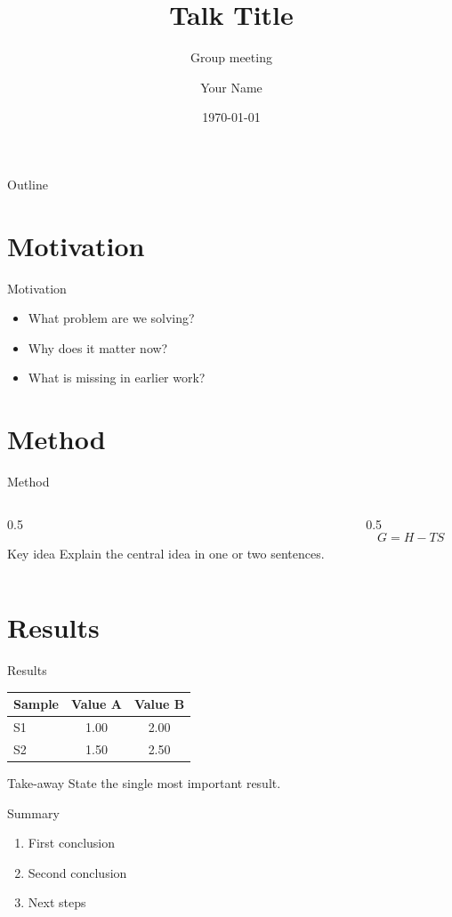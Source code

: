 \documentclass[aspectratio=169]{beamer}
\title{Talk Title}
\subtitle{Group meeting}
\author{Your Name}
\institute{Your Lab, Your University}
\date{\today}
\begin{document}
\begin{frame}
  \titlepage
\end{frame}

\begin{frame}{Outline}
  \tableofcontents
\end{frame}

\section{Motivation}
\begin{frame}{Motivation}
  \begin{itemize}
    \item What problem are we solving?
    \item Why does it matter now?
    \item What is missing in earlier work?
  \end{itemize}
\end{frame}

\section{Method}
\begin{frame}{Method}
  \begin{columns}
    \begin{column}{0.5\textwidth}
      \begin{block}{Key idea}
        Explain the central idea in one or two sentences.
      \end{block}
    \end{column}
    \begin{column}{0.5\textwidth}
      \begin{equation*}
        G = H - TS
      \end{equation*}
    \end{column}
  \end{columns}
\end{frame}

\section{Results}
\begin{frame}{Results}
  \centering
  \begin{tabular}{lcc}
    \toprule
    Sample & Value A & Value B \\
    \midrule
    S1 & 1.00 & 2.00 \\
    S2 & 1.50 & 2.50 \\
    \bottomrule
  \end{tabular}
  \begin{alertblock}{Take-away}
    State the single most important result.
  \end{alertblock}
\end{frame}

\begin{frame}{Summary}
  \begin{enumerate}
    \item First conclusion
    \item Second conclusion
    \item Next steps
  \end{enumerate}
\end{frame}
\end{document}
